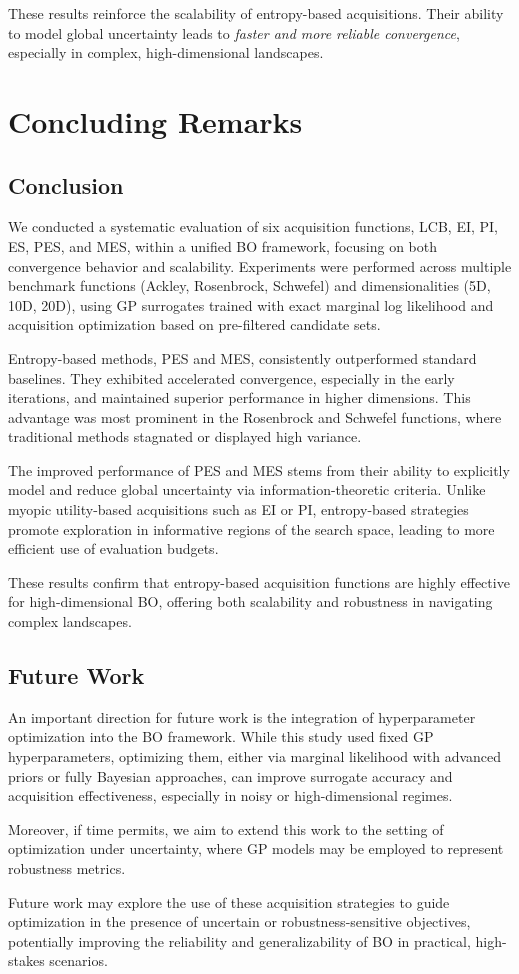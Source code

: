 \documentclass{ut-thesis}
\begin{document}
These results reinforce the scalability of entropy-based acquisitions. Their ability to model global uncertainty leads to \textit{faster and more reliable convergence}, especially in complex, high-dimensional landscapes.

\chapter{Concluding Remarks}

\section{Conclusion}
We conducted a systematic evaluation of six acquisition functions, LCB, EI, PI, ES, PES, and MES, within a unified BO framework, focusing on both convergence behavior and scalability. Experiments were performed across multiple benchmark functions (Ackley, Rosenbrock, Schwefel) and dimensionalities (5D, 10D, 20D), using GP surrogates trained with exact marginal log likelihood and acquisition optimization based on pre-filtered candidate sets.

Entropy-based methods, PES and MES, consistently outperformed standard baselines. They exhibited accelerated convergence, especially in the early iterations, and maintained superior performance in higher dimensions. This advantage was most prominent in the Rosenbrock and Schwefel functions, where traditional methods stagnated or displayed high variance.

The improved performance of PES and MES stems from their ability to explicitly model and reduce global uncertainty via information-theoretic criteria. Unlike myopic utility-based acquisitions such as EI or PI, entropy-based strategies promote exploration in informative regions of the search space, leading to more efficient use of evaluation budgets.

These results confirm that entropy-based acquisition functions are highly effective for high-dimensional BO, offering both scalability and robustness in navigating complex landscapes.

\section{Future Work}
An important direction for future work is the integration of hyperparameter optimization into the BO framework. While this study used fixed GP hyperparameters, optimizing them, either via marginal likelihood with advanced priors or fully Bayesian approaches, can improve surrogate accuracy and acquisition effectiveness, especially in noisy or high-dimensional regimes.

Moreover, if time permits, we aim to extend this work to the setting of optimization under uncertainty, where GP models may be employed to represent robustness metrics. 

Future work may explore the use of these acquisition strategies to guide optimization in the presence of uncertain or robustness-sensitive objectives, potentially improving the reliability and generalizability of BO in practical, high-stakes scenarios.



\end{document}
